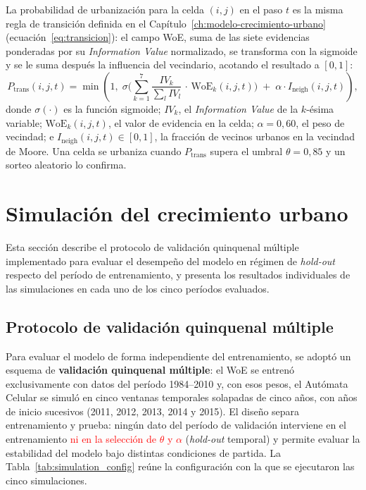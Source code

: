 La probabilidad de urbanización para la celda $(i,j)$ en el paso $t$ es la misma regla de transición definida en el Capítulo~\ref{ch:modelo-crecimiento-urbano} (ecuación~\ref{eq:transicion}): el campo WoE, suma de las siete evidencias ponderadas por su \textit{Information Value} normalizado, se transforma con la sigmoide y se le suma después la influencia del vecindario, acotando el resultado a $[0,1]$:
\begin{equation}
P_{\text{trans}}(i,j,t) = \min\!\left(1,\; \sigma\!\Big(\sum_{k=1}^{7} \frac{IV_k}{\sum_{l} IV_l}\, \cdot \,\text{WoE}_k(i,j,t)\Big) \;+\; \alpha \cdot I_{\text{neigh}}(i,j,t)\right),
\end{equation}
donde $\sigma(\cdot)$ es la función sigmoide; $IV_k$, el \textit{Information Value} de la $k$-ésima variable; $\text{WoE}_k(i,j,t)$, el valor de evidencia en la celda; $\alpha = 0{,}60$, el peso de vecindad; e $I_{\text{neigh}}(i,j,t) \in [0,1]$, la fracción de vecinos urbanos en la vecindad de Moore. Una celda se urbaniza cuando $P_{\text{trans}}$ supera el umbral $\theta = 0{,}85$ y un sorteo aleatorio lo confirma.

\section{Simulación del crecimiento urbano}

Esta sección describe el protocolo de validación quinquenal múltiple implementado para evaluar el desempeño del modelo en régimen de \textit{hold-out} respecto del período de entrenamiento, y presenta los resultados individuales de las simulaciones en cada uno de los cinco períodos evaluados.

\subsection{Protocolo de validación quinquenal múltiple}

Para evaluar el modelo de forma independiente del entrenamiento, se adoptó un esquema de \textbf{validación quinquenal múltiple}: el WoE se entrenó exclusivamente con datos del período 1984--2010 y, con esos pesos, el Autómata Celular se simuló en cinco ventanas temporales solapadas de cinco años, con años de inicio sucesivos (2011, 2012, 2013, 2014 y 2015). El diseño separa entrenamiento y prueba: ningún dato del período de validación interviene en el entrenamiento\textcolor{red}{ ni en la selección de $\theta$ y $\alpha$} (\textit{hold-out} temporal) y permite evaluar la estabilidad del modelo bajo distintas condiciones de partida. La Tabla~\ref{tab:simulation_config} reúne la configuración con la que se ejecutaron las cinco simulaciones.


